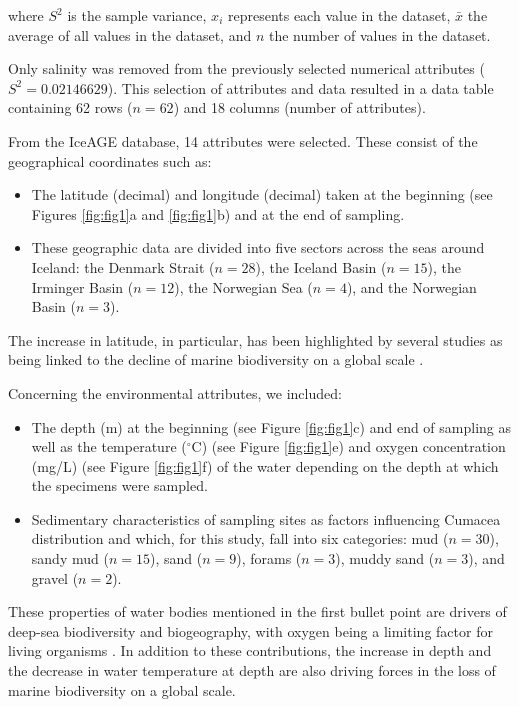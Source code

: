 where $S^2$ is the sample variance, $x_i$ represents each value in the dataset, $\bar{x}$ the average of all values in the dataset, and $n$ the number of values in the dataset.

Only salinity was removed from the previously selected numerical attributes ($S^2 = 0.02146629$). This selection of attributes and data resulted in a data table containing 62 rows ($n=62$) and 18 columns (number of attributes). 

From the IceAGE database, 14 attributes were selected. These consist of the geographical coordinates such as: 

\begin{itemize}
\item The latitude (decimal) and longitude (decimal) taken at the beginning (see Figures \ref{fig:fig1}a and \ref{fig:fig1}b) and at the end of sampling.
\item These geographic data are divided into five sectors across the seas around Iceland: the Denmark Strait ($n=28$), the Iceland Basin ($n=15$), the Irminger Basin ($n=12$), the Norwegian Sea ($n=4$), and the Norwegian Basin ($n=3$). 
\end{itemize}

The increase in latitude, in particular, has been highlighted by several studies as being linked to the decline of marine biodiversity on a global scale \citep{lambshead_latitudinal_2000, gage_diversity_2004}. 

Concerning the environmental attributes, we included:
\begin{itemize}
\item The depth (m) at the beginning (see Figure \ref{fig:fig1}c) and end of sampling as well as the temperature ($^\circ$C) (see Figure \ref{fig:fig1}e) and oxygen concentration (mg/L) (see Figure \ref{fig:fig1}f) of the water depending on the depth at which the specimens were sampled. 
\item Sedimentary characteristics of sampling sites as factors influencing Cumacea distribution \citep{uhlir_adding_2021} and which, for this study, fall into six categories: mud ($n=30$), sandy mud ($n=15$), sand ($n=9$), forams ($n=3$), muddy sand ($n=3$), and gravel ($n=2$).
\end{itemize}

These properties of water bodies mentioned in the first bullet point are drivers of deep-sea biodiversity and biogeography, with oxygen being a limiting factor for living organisms \citep{keeling_ocean_2010}. In addition to these contributions, the increase in depth \citep{rex_global_2006,costello_marine_2017} and the decrease in water temperature at depth \citep{lambshead_latitudinal_2000} are also driving forces in the loss of marine biodiversity on a global scale.

